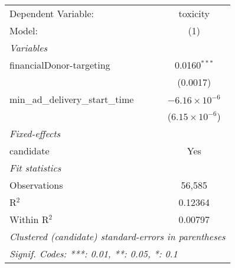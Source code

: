
\begingroup
\centering
\begin{tabular}{lc}
   \tabularnewline \midrule \midrule
   Dependent Variable:                & toxicity\\  
   Model:                             & (1)\\  
   \midrule
   \emph{Variables}\\
   financialDonor-targeting           & 0.0160$^{***}$\\   
                                      & (0.0017)\\   
   min\_ad\_delivery\_start\_time     & $-6.16\times 10^{-6}$\\    
                                      & ($6.15\times 10^{-6}$)\\    
   \midrule
   \emph{Fixed-effects}\\
   candidate                          & Yes\\  
   \midrule
   \emph{Fit statistics}\\
   Observations                       & 56,585\\  
   R$^2$                              & 0.12364\\  
   Within R$^2$                       & 0.00797\\  
   \midrule \midrule
   \multicolumn{2}{l}{\emph{Clustered (candidate) standard-errors in parentheses}}\\
   \multicolumn{2}{l}{\emph{Signif. Codes: ***: 0.01, **: 0.05, *: 0.1}}\\
\end{tabular}
\par\endgroup


